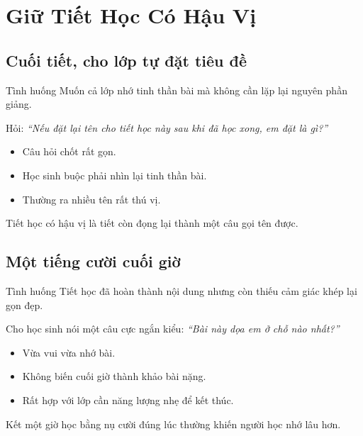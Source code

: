 \chapter{Giữ Tiết Học Có Hậu Vị}

\section{Cuối tiết, cho lớp tự đặt tiêu đề}
\begin{tinhhuong}{Tình huống}
Muốn cả lớp nhớ tinh thần bài mà không cần lặp lại nguyên phần giảng.
\end{tinhhuong}
\begin{goiydungngay}
Hỏi: \textit{``Nếu đặt lại tên cho tiết học này sau khi đã học xong, em đặt là gì?''}
\begin{itemize}
\item Câu hỏi chốt rất gọn.
\item Học sinh buộc phải nhìn lại tinh thần bài.
\item Thường ra nhiều tên rất thú vị.
\end{itemize}
\end{goiydungngay}
\begin{cauchot}
Tiết học có hậu vị là tiết còn đọng lại thành một câu gọi tên được.
\end{cauchot}
\ngancach

\section{Một tiếng cười cuối giờ}
\begin{tinhhuong}{Tình huống}
Tiết học đã hoàn thành nội dung nhưng còn thiếu cảm giác khép lại gọn đẹp.
\end{tinhhuong}
\begin{goiydungngay}
Cho học sinh nói một câu cực ngắn kiểu: \textit{``Bài này dọa em ở chỗ nào nhất?''}
\begin{itemize}
\item Vừa vui vừa nhớ bài.
\item Không biến cuối giờ thành khảo bài nặng.
\item Rất hợp với lớp cần năng lượng nhẹ để kết thúc.
\end{itemize}
\end{goiydungngay}
\begin{cauchot}
Kết một giờ học bằng nụ cười đúng lúc thường khiến người học nhớ lâu hơn.
\end{cauchot}
\ngancach

